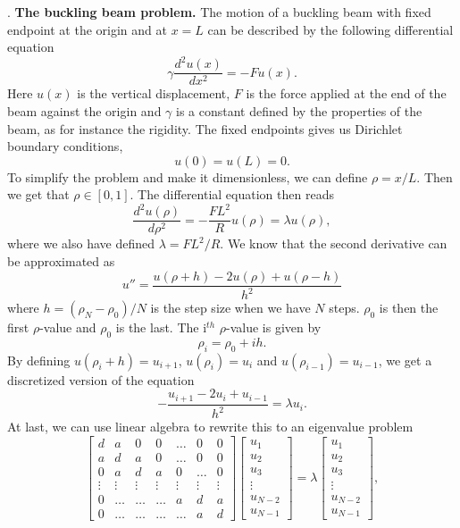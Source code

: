 \documentclass[a4paper,10pt]{article}
\newcommand{\dder}[2]{\frac{d^2 #1}{d #2 ^2}}
\begin{document}
. \textbf{The buckling beam problem.} 
The motion of a buckling beam with fixed endpoint at the origin and at $x=L$ can be described by the following differential equation
\begin{equation*}
    \gamma \dder{u(x)}{x} = - F u(x).
\end{equation*}
Here $u(x)$ is the vertical displacement, $F$ is the force applied at the end of the beam against the origin and $\gamma$ is a constant defined by the properties of the beam, as for instance the rigidity. The fixed endpoints gives us Dirichlet boundary conditions,
$$u(0) = u(L) = 0. $$
To simplify the problem and make it dimensionless, we can define $\rho = x/L$. Then we get that $\rho \in [0,1]$. The differential equation then reads 
\begin{equation*}
    \dder{u(\rho)}{\rho} = -\frac{FL^2}{R} u(\rho) = \lambda u(\rho),
\end{equation*}
where we also have defined $\lambda = FL^2/R$. We know that the second derivative can be approximated as 
$$u'' = \frac{u(\rho + h) - 2u(\rho) + u(\rho-h)}{h^2} $$
where $h = (\rho_N - \rho_0)/N$ is the step size when we have $N$ steps. $\rho_0$ is then the first $\rho$-value and $\rho_0$ is the last. The i$^{th}$ $\rho$-value is given by 
$$ \rho_i = \rho_0 + ih.  $$
By defining $u(\rho_i + h) = u_{i+1}$, $u(\rho_i) = u_i$ and $u(\rho_{i-1}) = u_{i-1}$, we get a discretized version of the equation 
\begin{equation*}
    - \frac{u_{i+1} - 2u_i + u_{i-1}}{h^2} = \lambda u_i.
\end{equation*}
At last, we can use linear algebra to rewrite this to an eigenvalue problem 
\begin{equation*}
\begin{bmatrix} d& a & 0   & 0    & \dots  &0     & 0 \\
                                a & d & a & 0    & \dots  &0     &0 \\
                                0   & a & d & a  &0       &\dots & 0\\
                                \vdots  & \vdots & \vdots & \vdots  &\vdots  &\vdots & \vdots\\
                                0   & \dots & \dots & \dots  &a  &d & a\\
                                0   & \dots & \dots & \dots  &\dots       &a & d\end{bmatrix} 
                                 \begin{bmatrix} u_1 \\ u_2 \\ u_3 \\ \vdots \\ u_{N-2} \\ u_{N-1}\end{bmatrix} = \lambda \begin{bmatrix} u_1 \\ u_2 \\ u_3 \\ \vdots \\ u_{N-2} \\ u_{N-1}\end{bmatrix},
\label{eq:matrixse} 
\end{equation*}
\end{document}
